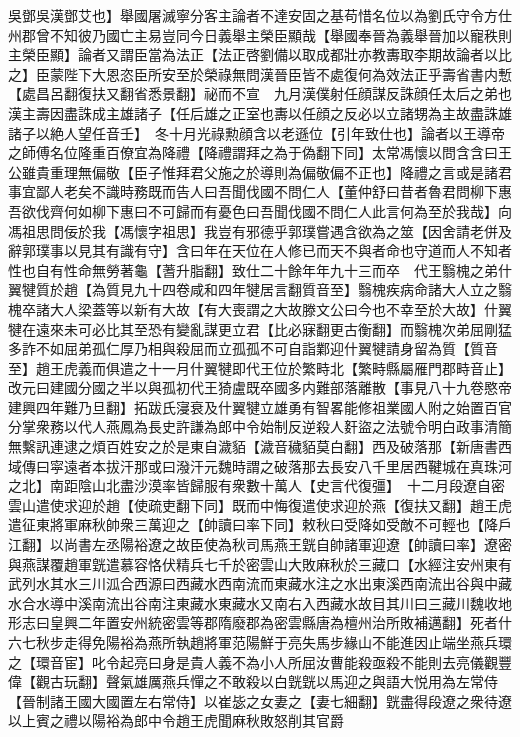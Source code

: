 吳鄧吳漢鄧艾也】舉國屠滅寧分客主論者不達安固之基苟惜名位以為劉氏守令方仕州郡曾不知彼乃國亡主易豈同今日義舉主榮臣顯哉【舉國奉晉為義舉晉加以寵秩則主榮臣顯】論者又謂臣當為法正【法正啓劉備以取成都壯亦教夀取李期故論者以比之】臣蒙陛下大恩恣臣所安至於榮祿無問漢晉臣皆不處復何為效法正乎壽省書内慙【處昌呂翻復扶又翻省悉景翻】祕而不宣　九月漢僕射任顔謀反誅顔任太后之弟也漢主壽因盡誅成主雄諸子【任后雄之正室也夀以任顔之反必以立諸甥為主故盡誅雄諸子以絶人望任音壬】　冬十月光祿勲顔含以老遜位【引年致仕也】論者以王導帝之師傅名位隆重百僚宜為降禮【降禮謂拜之為于偽翻下同】太常馮懷以問含含曰王公雖貴重理無偏敬【臣子惟拜君父施之於導則為偏敬偏不正也】降禮之言或是諸君事宜鄙人老矣不識時務既而告人曰吾聞伐國不問仁人【董仲舒曰昔者魯君問柳下惠吾欲伐齊何如柳下惠曰不可歸而有憂色曰吾聞伐國不問仁人此言何為至於我哉】向馮祖思問佞於我【馮懷字祖思】我豈有邪德乎郭璞嘗遇含欲為之筮【因舍請老併及辭郭璞事以見其有識有守】含曰年在天位在人修已而天不與者命也守道而人不知者性也自有性命無勞著龜【蓍升脂翻】致仕二十餘年年九十三而卒　代王翳槐之弟什翼犍質於趙【為質見九十四卷咸和四年犍居言翻質音至】翳槐疾病命諸大人立之翳槐卒諸大人梁蓋等以新有大故【有大喪謂之大故滕文公曰今也不幸至於大故】什翼犍在遠來未可必比其至恐有變亂謀更立君【比必寐翻更古衡翻】而翳槐次弟屈剛猛多詐不如屈弟孤仁厚乃相與殺屈而立孤孤不可自詣鄴迎什翼犍請身留為質【質音至】趙王虎義而俱遣之十一月什翼犍即代王位於繁畤北【繁畤縣屬雁門郡畤音止】改元曰建國分國之半以與孤初代王猗盧既卒國多内難部落離散【事見八十九卷愍帝建興四年難乃旦翻】拓跋氏寖衰及什翼犍立雄勇有智畧能修祖業國人附之始置百官分掌衆務以代人燕鳳為長史許謙為郎中令始制反逆殺人姧盜之法號令明白政事清簡無繫訊連逮之煩百姓安之於是東自濊貊【濊音穢貊莫白翻】西及破落那【新唐書西域傳曰寜遠者本拔汗那或曰潑汗元魏時謂之破落那去長安八千里居西鞬城在真珠河之北】南距陰山北盡沙漠率皆歸服有衆數十萬人【史言代復彊】　十二月段遼自密雲山遣使求迎於趙【使疏吏翻下同】既而中悔復遣使求迎於燕【復扶又翻】趙王虎遣征東將軍麻秋帥衆三萬迎之【帥讀曰率下同】敕秋曰受降如受敵不可輕也【降戶江翻】以尚書左丞陽裕遼之故臣使為秋司馬燕王皝自帥諸軍迎遼【帥讀曰率】遼密與燕謀覆趙軍皝遣慕容恪伏精兵七千於密雲山大敗麻秋於三藏口【水經注安州東有武列水其水三川泒合西源曰西藏水西南流而東藏水注之水出東溪西南流出谷與中藏水合水導中溪南流出谷南注東藏水東藏水又南右入西藏水故目其川曰三藏川魏收地形志曰皇興二年置安州統密雲等郡隋廢郡為密雲縣唐為檀州治所敗補邁翻】死者什六七秋步走得免陽裕為燕所執趙將軍范陽鮮于亮失馬步緣山不能進因止端坐燕兵環之【環音宦】叱令起亮曰身是貴人義不為小人所屈汝曹能殺亟殺不能則去亮儀觀豐偉【觀古玩翻】聲氣雄厲燕兵憚之不敢殺以白皝皝以馬迎之與語大悦用為左常侍【晉制諸王國大國置左右常侍】以崔毖之女妻之【妻七細翻】皝盡得段遼之衆待遼以上賓之禮以陽裕為郎中令趙王虎聞麻秋敗怒削其官爵

